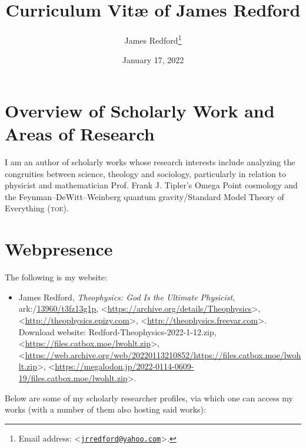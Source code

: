 \documentclass[letterpaper,11pt]{article}
\title{Curriculum Vit{\ae} of James Redford}
\author{James Redford\footnote{Email address: \textless\href{mailto:jrredford@yahoo.com}{\nolinkurl{jrredford@yahoo.com}}\textgreater .}}
\date{January 17, 2022}
\newcommand{\dsc}{\discretionary{}{}{}}
\begin{document}
\maketitle

\section{Overview of Scholarly Work and Areas of Research}
\label{sec:OverviewOfScholarlyWorkAndAreasOfResearch}

I am an author of scholarly works whose research interests include analyzing the congruities between science, theology and sociology, particularly in relation to physicist and mathematician Prof. Frank J. Tipler's Omega Point cosmology and the Feynman--DeWitt--Weinberg quantum gravity\slash Standard Model Theory of Everything (\textsc{toe}).

\section{Webpresence}
\label{sec:Webpresence}

The following is my website:

\begin{itemize}
\small
\item James Redford, \emph{Theophysics: God Is the Ultimate Physicist}, ark:/\discretionary{}{}{}\href{https://n2t.net/ark:/13960/t3fz13g1p}{13960/\dsc t3fz13g1p}, \textless\url{https://archive.org/details/Theophysics}\textgreater , \textless\url{http://theophysics.epizy.com}\textgreater , \textless\href{http://theophysics.freevar.com}{\textsf{http\dsc :\dsc //\dsc theophysics\dsc .freevar\dsc .com}}\textgreater . Download website: Redford-Theophysics-2022-1-12.zip\thinspace , \textless\href{https://files.catbox.moe/lwohlt.zip}{\textsf{https\dsc :\dsc //\dsc files\dsc .catbox\dsc .moe/\dsc lwohlt\dsc .zip}}\textgreater , \textless\href{https://web.archive.org/web/20220113210852/https://files.catbox.moe/lwohlt.zip}{\textsf{https\dsc :\dsc //\dsc web\dsc .archive\dsc .org/\dsc web/\dsc 20220113\dsc 210852/\dsc https\dsc :\dsc //\dsc files\dsc .catbox\dsc .moe/\dsc lwohlt\dsc .zip}}\textgreater , \textless\href{https://megalodon.jp/2022-0114-0609-19/files.catbox.moe/lwohlt.zip}{\textsf{https\dsc :\dsc //\dsc megalodon\dsc .jp/\dsc 2022\dsc -0114\dsc -0609\dsc -19/\dsc files\dsc .catbox\dsc .moe/\dsc lwohlt\dsc .zip}}\textgreater .
\end{itemize}

Below are some of my scholarly researcher profiles, via which one can access my works (with a number of them also hosting said works):
\end{document}
